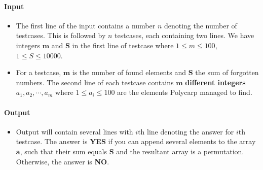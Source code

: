 \documentclass[a4paper]{exam}
\begin{document}
\begin{questions}
\begin{itemize}
    \end{itemize}


    \paragraph{Input}

    \begin{itemize}
        \item The first line of the input contains a number $n$ denoting the number of testcases. This is followed by $n$ testcases, each containing two lines. We have integers $\mathbf{m}$ and $\mathbf{S}$ in the first line of testcase where $ 1 \leq m \leq 100 $,$1 \leq S \leq 10000 $.
        \item For a testcase, $\mathbf{m}$ is the number of found elements and $\mathbf{S}$ the sum of forgotten numbers. The second line of each testcase contains $\mathbf{m}$ \textbf{different integers} $a_1,a_2, \cdots, a_m$ where $1 \leq a_i \leq 100$ are the elements Polycarp managed to find.
    \end{itemize}

    \paragraph{Output}
    \begin{itemize}
        \item Output will contain several lines with $i$th line denoting the answer for $i$th testcase. The answer is \textbf{YES} if you can append several elements to the array \textbf{a}, such that their sum equals $\mathbf{S}$ and the resultant array is a permutation. Otherwise, the answer is \textbf{NO}.
    \end{itemize}


\end{questions}
\end{document}
